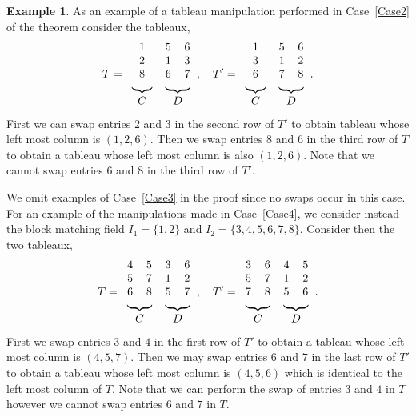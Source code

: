 \documentclass[10pt]{amsart}
\theoremstyle{definition}
\newtheorem{exam}[theo]{Example}
\begin{document}
\begin{exam}
As an example of a tableau manipulation performed in Case~\ref{Case2} of the theorem consider the tableaux, 
\[
T = 
\begin{tabular}{ccc}
 1 & 5 & 6 \\
 2 & 1 & 3 \\
 8 & 6 & 7 \\
 \multicolumn{1}{c}{\upbracefill} & \multicolumn{2}{c}{\upbracefill}\\
 \multicolumn{1}{c}{$C$} & \multicolumn{2}{c}{$D$}\\
\end{tabular},
\quad
T' = 
\begin{tabular}{ccc}
 1 & 5 & 6 \\
 3 & 1 & 2 \\
 6 & 7 & 8 \\
 \multicolumn{1}{c}{\upbracefill} & \multicolumn{2}{c}{\upbracefill}\\
 \multicolumn{1}{c}{$C$} & \multicolumn{2}{c}{$D$}\\
\end{tabular}.
\]
First we can swap entries $2$ and $3$ in the second row of $T'$ to obtain tableau whose left most column is $(1,2,6)$. Then we swap entries $8$ and $6$ in the third row of $T$ to obtain a tableau whose left most column is also $(1,2,6)$. Note that we cannot swap entries $6$ and $8$ in the third row of $T'$.

\medskip
We omit examples of Case~\ref{Case3} in the proof since no swaps occur in this case. For an example of the manipulations made in Case~\ref{Case4}, we consider instead the block matching field 
$I_1 = \{1, 2\}$ and $I_2 = \{3,4,5,6,7,8 \}$. Consider then the two tableaux, 
\[
T = 
\begin{tabular}{cccc}
 4 & 5 & 3 & 6 \\
 5 & 7 & 1 & 2 \\
 6 & 8 & 5 & 7 \\
 \multicolumn{2}{c}{\upbracefill} & \multicolumn{2}{c}{\upbracefill}\\
 \multicolumn{2}{c}{$C$} & \multicolumn{2}{c}{$D$}\\
\end{tabular},
\quad
T' = 
\begin{tabular}{cccc}
 3 & 6 & 4 & 5 \\
 5 & 7 & 1 & 2 \\
 7 & 8 & 5 & 6 \\
 \multicolumn{2}{c}{\upbracefill} & \multicolumn{2}{c}{\upbracefill}\\
 \multicolumn{2}{c}{$C$} & \multicolumn{2}{c}{$D$}\\
\end{tabular}.
\]
First we swap entries $3$ and $4$ in the first row of $T'$ to obtain a tableau whose left most column is $(4,5,7)$. Then we may swap entries $6$ and $7$ in the last row of $T'$ to obtain a tableau whose left most column is $(4,5,6)$ which is identical to the left most column of $T$. Note that we can perform the swap of entries $3$ and $4$ in $T$ however we cannot swap entries $6$ and $7$ in $T$. 

\end{exam}
\end{document}
